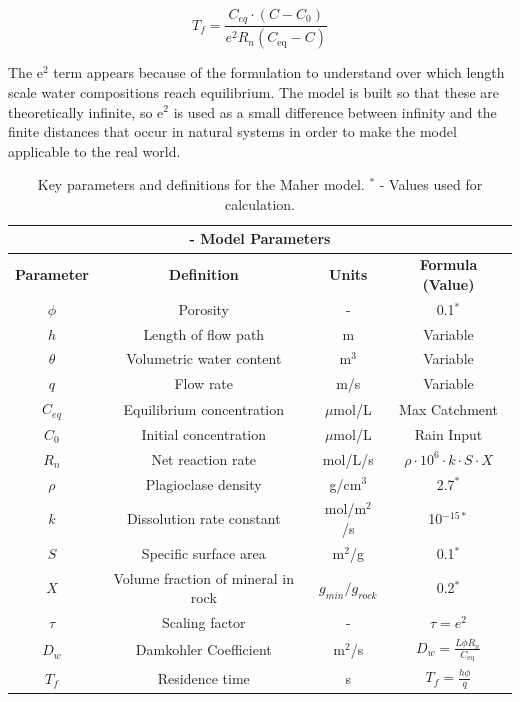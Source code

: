 \begin{equation}
    T_f = \frac{C_{eq} \cdot \left(C - C_0\right)}{e^2 R_n \left( C_{\text{eq}} - C \right)}
\end{equation}

The e$^2$ term appears because of the \textcite{maherHydrologicRegulationChemical2014} formulation to understand over which length scale water compositions reach equilibrium. The model is built so that these are theoretically infinite, so e$^2$ is used as a small difference between infinity and the finite distances that occur in natural systems in order to make the model applicable to the real world.

\begin{table}[H]
    \centering
    \renewcommand{\arraystretch}{1.1} %
    \begin{tabular}{|c|c|c|c|}
        \hline  %
        \multicolumn{4}{|c|}{\textbf{\textcite{maherRoleFluidResidence2011} - Model Parameters}} \\  
        \hline
        \textbf{Parameter} & \textbf{Definition} & \textbf{Units} & \textbf{Formula (Value)} \\
        \hline
        $\phi$ & Porosity & - & 0.1$^*$ \\
        $h$ & Length of flow path & m & Variable \\
        $\theta$ & Volumetric water content & m$^3$ & Variable \\
        $q$ & Flow rate & m/s & Variable \\
        $C_{eq}$ & Equilibrium concentration & $\mu$mol/L & Max Catchment \\
        $C_0$ & Initial concentration & $\mu$mol/L & Rain Input \\
        $R_n$ & Net reaction rate & mol/L/s & $\rho \cdot 10^6 \cdot k \cdot S \cdot X $ \\
        $\rho$ & Plagioclase density & g/cm$^3$ & 2.7$^*$ \\
        $k$ & Dissolution rate constant & mol/m$^2$/s & 10$^{-15*}$ \\
        $S$ & Specific surface area & m$^2$/g & 0.1$^*$ \\
        $X$ & Volume fraction of mineral in rock & $g_{min}/g_{rock}$& 0.2$^*$ \\
        $\tau$ & Scaling factor & - & $\tau = e^2$ \\
        $D_w$ & Damkohler Coefficient & m$^2$/s & $D_w = \frac{L \phi R_n}{C_{\text{eq}}}$ \\
        $T_f$ & Residence time & s & $T_f = \frac{h \phi}{q}$ \\
        \hline
    \end{tabular}
    \caption{Key parameters and definitions for the Maher model. $^*$ - Values used for calculation.}
    \label{tab:maher1}
\end{table}

